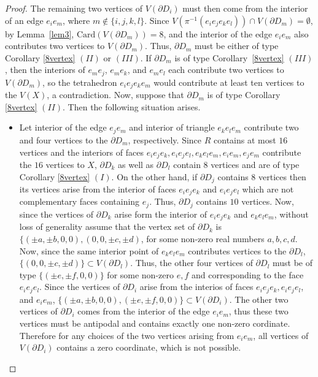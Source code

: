 \documentclass[10pt,a4paper]{amsart}
\begin{document}
\begin{proof}
The remaining two vertices of $V(\partial D_i)$ must then come from the interior of an edge $e_i e_m$, where $m \notin  \{i,j,k,l\}$.  Since $V(\pi^{-1}(e_ie_je_ke_l))\cap V(\partial D_m)=\emptyset$, by Lemma~\ref{lem3}, $\mathrm{Card}(V(\partial D_m)) = 8$, and the interior of the edge $e_i e_m$ also contributes two vertices to $V(\partial D_m)$.  Thus, $\partial D_m$ must be either of type Corollary \ref{8vertex} $(II)$ or $(III)$. 
If $\partial D_m$ is of type  Corollary~\ref{8vertex} $(III)$, then the interiors of $e_m e_j$, $e_m e_k$, and $e_m e_l$ each contribute two vertices to $V(\partial D_m)$, so the tetrahedron $e_i e_j e_k e_m$ would contribute at least ten vertices to the $V(X)$, a contradiction. Now, suppose that $\partial D_m$ is of type   Corollary \ref{8vertex} $(II)$. Then the following situation arises.
\begin{itemize}
\item Let interior of the edge $e_je_m$ and interior of triangle $e_ke_le_m$ contribute two and four vertices to the $\partial D_m$, respectively. Since $R$ contains at most $16$ vertices and the interiors of faces $e_ie_je_k,e_ie_je_l,e_ke_le_m,e_ie_m,e_je_m$ contribute the $16$ vertices to $X$, $\partial D_k$ as well as $\partial D_l$ contain $8$ vertices and are of type Corollary \ref{8vertex} $(I)$. On the other hand, if $\partial D_j$ contains $8$ vertices then its vertices arise from the interior of faces $e_ie_je_k$ and $e_ie_je_l$  which are not complementary faces containing $e_j$. Thus, $\partial D_j$ contains  $10$ vertices. Now, since the vertices of $\partial D_k$ arise form the interior of $e_ie_je_k$ and $e_ke_le_m$, without loss of generality assume that the vertex set of $\partial D_k$ is $\{(\pm a,\pm b,0,0),(0,0,\pm c,\pm d)$, for some non-zero real numbers $a,b,c,d$. Now, since the same interior point of $e_ke_le_m$ contributes vertices to the $\partial D_l$, $\{(0,0,\pm c,\pm d)\}\subset  V(\partial D_l)$. Thus, the other four vertices of $\partial D_l$ must be of type $\{(\pm e, \pm f,0,0)\}$ for some non-zero $e,f$ and corresponding to the face $e_ie_je_l$. Since the vertices of $\partial D_i$ arise from the interios of faces $e_ie_je_k,e_ie_je_l$, and $e_ie_m$, $\{(\pm a,\pm b,0,0),(\pm e, \pm f,0,0) \}\subset V(\partial D_i)$. The other two vertices of $\partial D_i$ comes from the interior of the edge $e_ie_m$, thus these two vertices must be antipodal and contains exactly one non-zero cordinate. Therefore for any choices of the two vertices arising from $e_ie_m$, all vertices of $V(\partial D _i)$ contains a zero coordinate, which is not possible. 


\end{itemize}
\end{proof}
\end{document}
